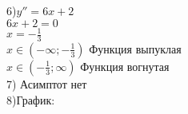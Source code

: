\documentclass[a4paper]{article}
\begin{document}
    6)$y''=6x+2$\\
    $6x+2=0$\\
    $x=-\frac{1}{3}$\\
    $x \in (-\infty;-\frac{1}{3})$ Функция выпуклая\\
    $x \in (-\frac{1}{3};\infty)$  Функция вогнутая\\
    7) Асимптот нет\\
    8)График:\\
\end{document}
